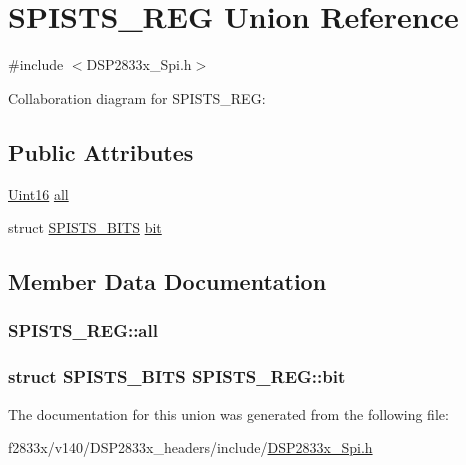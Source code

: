 \hypertarget{union_s_p_i_s_t_s___r_e_g}{}\section{S\+P\+I\+S\+T\+S\+\_\+\+R\+E\+G Union Reference}
\label{union_s_p_i_s_t_s___r_e_g}


{\ttfamily \#include $<$D\+S\+P2833x\+\_\+\+Spi.\+h$>$}



Collaboration diagram for S\+P\+I\+S\+T\+S\+\_\+\+R\+E\+G\+:
\subsection*{Public Attributes}
\begin{DoxyCompactItemize}
\item 
\hyperlink{_d_s_p2833x___device_8h_a59a9f6be4562c327cbfb4f7e8e18f08b}{Uint16} \hyperlink{union_s_p_i_s_t_s___r_e_g_acd1538e43001927ee8048b32b3dfbb57}{all}
\item 
struct \hyperlink{struct_s_p_i_s_t_s___b_i_t_s}{S\+P\+I\+S\+T\+S\+\_\+\+B\+I\+T\+S} \hyperlink{union_s_p_i_s_t_s___r_e_g_adc0587499d95972a0bd201047a3ef271}{bit}
\end{DoxyCompactItemize}


\subsection{Member Data Documentation}
\hypertarget{union_s_p_i_s_t_s___r_e_g_acd1538e43001927ee8048b32b3dfbb57}{}
\subsubsection[{all}]{ S\+P\+I\+S\+T\+S\+\_\+\+R\+E\+G\+::all}\label{union_s_p_i_s_t_s___r_e_g_acd1538e43001927ee8048b32b3dfbb57}
\hypertarget{union_s_p_i_s_t_s___r_e_g_adc0587499d95972a0bd201047a3ef271}{}
\subsubsection[{bit}]{\setlength{\rightskip}{0pt plus 5cm}struct {\bf S\+P\+I\+S\+T\+S\+\_\+\+B\+I\+T\+S} S\+P\+I\+S\+T\+S\+\_\+\+R\+E\+G\+::bit}\label{union_s_p_i_s_t_s___r_e_g_adc0587499d95972a0bd201047a3ef271}


The documentation for this union was generated from the following file\+:\begin{DoxyCompactItemize}
\item 
f2833x/v140/\+D\+S\+P2833x\+\_\+headers/include/\hyperlink{_d_s_p2833x___spi_8h}{D\+S\+P2833x\+\_\+\+Spi.\+h}\end{DoxyCompactItemize}
